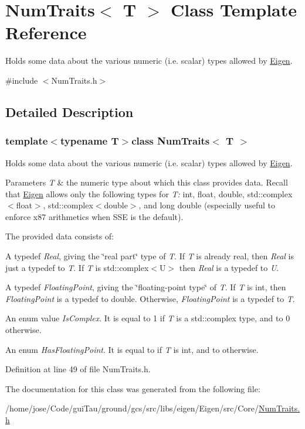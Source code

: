 \hypertarget{struct_num_traits}{\section{Num\-Traits$<$ T $>$ Class Template Reference}
\label{struct_num_traits}
}


Holds some data about the various numeric (i.\-e. scalar) types allowed by \hyperlink{namespace_eigen}{Eigen}.  




{\ttfamily \#include $<$Num\-Traits.\-h$>$}



\subsection{Detailed Description}
\subsubsection*{template$<$typename T$>$class Num\-Traits$<$ T $>$}

Holds some data about the various numeric (i.\-e. scalar) types allowed by \hyperlink{namespace_eigen}{Eigen}. 


\begin{DoxyParams}{Parameters}
{\em T} & the numeric type about which this class provides data. Recall that \hyperlink{namespace_eigen}{Eigen} allows only the following types for {\itshape T\-:} {\ttfamily int}, {\ttfamily float}, {\ttfamily double}, {\ttfamily std\-::complex$<$float$>$}, {\ttfamily std\-::complex$<$double$>$}, and {\ttfamily long} {\ttfamily double} (especially useful to enforce x87 arithmetics when S\-S\-E is the default).\\
\hline
\end{DoxyParams}
The provided data consists of\-: \begin{DoxyItemize}
\item A typedef {\itshape Real}, giving the \char`\"{}real part\char`\"{} type of {\itshape T}. If {\itshape T} is already real, then {\itshape Real} is just a typedef to {\itshape T}. If {\itshape T} is {\ttfamily std\-::complex$<$\-U$>$} then {\itshape Real} is a typedef to {\itshape U}. \item A typedef {\itshape Floating\-Point}, giving the \char`\"{}floating-\/point type\char`\"{} of {\itshape T}. If {\itshape T} is {\ttfamily int}, then {\itshape Floating\-Point} is a typedef to {\ttfamily double}. Otherwise, {\itshape Floating\-Point} is a typedef to {\itshape T}. \item An enum value {\itshape Is\-Complex}. It is equal to 1 if {\itshape T} is a {\ttfamily std\-::complex} type, and to 0 otherwise. \item An enum {\itshape Has\-Floating\-Point}. It is equal to {} if {\itshape T} is {\ttfamily int}, and to {} otherwise. \end{DoxyItemize}


Definition at line 49 of file Num\-Traits.\-h.



The documentation for this class was generated from the following file\-:\begin{DoxyCompactItemize}
\item 
/home/jose/\-Code/gui\-Tau/ground/gcs/src/libs/eigen/\-Eigen/src/\-Core/\hyperlink{_num_traits_8h}{Num\-Traits.\-h}\end{DoxyCompactItemize}
